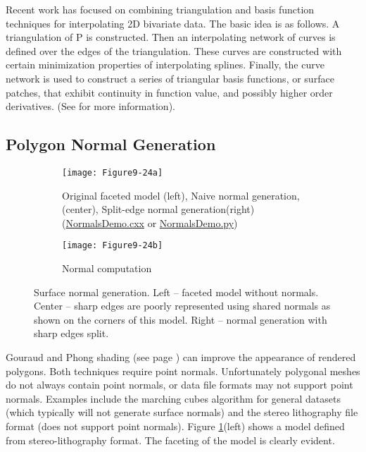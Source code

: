 Recent work has focused on combining triangulation and basis function techniques for interpolating 2D bivariate data. The basic idea is as follows. A triangulation of P is constructed. Then an interpolating network of curves is defined over the edges of the triangulation. These curves are constructed with certain minimization properties of interpolating splines. Finally, the curve network is used to construct a series of triangular basis functions, or surface patches, that exhibit continuity in function value, and possibly higher order derivatives. (See \cite{Nielson91a} for more information).

\subsection{Polygon Normal Generation}

\begin{figure}[htb]
    \centering
	\begin{subfigure}[h]{0.96\linewidth}
		\texttt{[image: Figure9-24a]}
		\captionsetup{justification=centering}
		\caption{Original faceted model (left), Naive normal generation,(center), Split-edge normal generation(right) (\href{https://lorensen.github.io/VTKExamples/site/Cxx/Visualization/NormalsDemo/}{NormalsDemo.cxx} or \href{https://lorensen.github.io/VTKExamples/site/Python/Visualization/NormalsDemo/}{NormalsDemo.py})}
		\label{fig:Figure9-24a}
	\end{subfigure}
	\hfill
	\begin{subfigure}[h]{0.4\linewidth}
		\texttt{[image: Figure9-24b]}
		\captionsetup{justification=centering}
		\caption{Normal computation}
		\label{fig:Figure9-24b}
	\end{subfigure}
	\caption{ Surface normal generation. Left -- faceted model without normals. Center -- sharp edges are poorly represented using shared normals as shown on the corners of this model. Right -- normal generation with sharp edges split.}\label{fig:Figure9-24}
\end{figure}

Gouraud and Phong shading (see page \pageref{subsection:rasterization.phong}) can improve the appearance of rendered polygons. Both techniques require point normals. Unfortunately polygonal meshes do not always contain point normals, or data file formats may not support point normals. Examples include the marching cubes algorithm for general datasets (which typically will not generate surface normals) and the stereo lithography file format (does not support point normals). Figure \ref{fig:Figure9-24a}(left) shows a model defined from stereo-lithography format. The faceting of the model is clearly evident.

